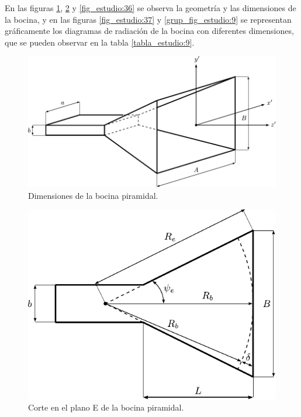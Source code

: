 En las figuras \ref{fig_estudio:34}, \ref{fig_estudio:35} y \ref{fig_estudio:36} se observa la geometría y las dimensiones de la bocina, y en las figuras \ref{fig_estudio:37} y \ref{grup_fig_estudio:9} se representan gráficamente los diagramas de radiación de la bocina con diferentes dimensiones, que se pueden observar en la tabla \ref{tabla_estudio:9}.
\begin{figure}[H]
\centering
\includegraphics[scale = 1]{Figures/Estudio/estudio_34}
\caption{Dimensiones de la bocina piramidal.}
\label{fig_estudio:34}
\end{figure}
\begin{figure}[H]
\centering
\includegraphics[scale = 1]{Figures/Estudio/estudio_35}
\caption{Corte en el plano E de la bocina piramidal.}
\label{fig_estudio:35}
\end{figure}
